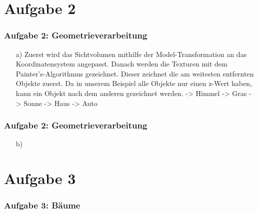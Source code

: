 \documentclass[accentcolor=tud9c,colorbacktitle,inverttitle,landscape,german,presentation,t]{tudbeamer}
\begin{document}
\section{Aufgabe 2}
	\begin{frame}
		\frametitle{Aufgabe 2: Geometrieverarbeitung} %
		\begin{itemize}
		\item[a)] Zuerst wird das Sichtvolumen mithilfe der Model-Transformation an das Koordinatensystem angepasst. Danach werden die Texturen mit dem Painter's-Algorithmus gezeichnet. Dieser zeichnet die am weitesten entfernten Objekte zuerst. Da in unserem Beispiel alle Objekte nur einen z-Wert haben, kann ein Objekt nach dem anderen gezeichnet werden. -> Himmel -> Gras -> Sonne -> Haus -> Auto
		\end{itemize}
	\end{frame}
	\begin{frame}
	\frametitle{Aufgabe 2: Geometrieverarbeitung} %
	\begin{itemize}

		\item[b)]
	\end{itemize}
\end{frame}
	
\section{Aufgabe 3}
	\begin{frame}
		\frametitle{Aufgabe 3: B\"aume} %
	\end{frame}
	
\end{document}
